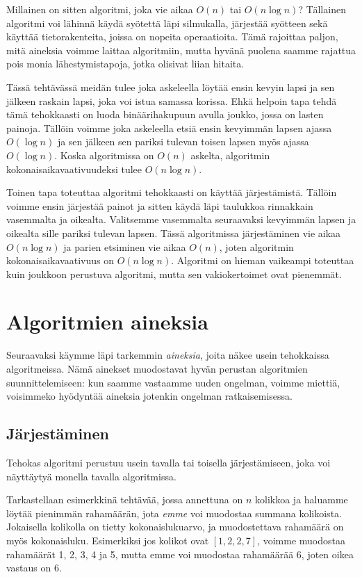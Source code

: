 Millainen on sitten algoritmi, joka vie aikaa $O(n)$ tai $O(n \log n)$?
Tällainen algoritmi voi lähinnä käydä syötettä läpi silmukalla,
järjestää syötteen sekä käyttää tietorakenteita,
joissa on nopeita operaatioita.
Tämä rajoittaa paljon, mitä aineksia voimme laittaa algoritmiin,
mutta hyvänä puolena saamme rajattua pois monia lähestymistapoja,
jotka olisivat liian hitaita.

Tässä tehtävässä meidän tulee joka askeleella löytää
ensin kevyin lapsi ja sen jälkeen raskain lapsi,
joka voi istua samassa korissa.
Ehkä helpoin tapa tehdä tämä tehokkaasti
on luoda binäärihakupuun avulla joukko, jossa on lasten painoja.
Tällöin voimme joka askeleella etsiä ensin kevyimmän
lapsen ajassa $O(\log n)$ ja sen jälkeen sen pariksi
tulevan toisen lapsen myös ajassa $O(\log n)$.
Koska algoritmissa on $O(n)$ askelta, algoritmin
kokonaisaikavaativuudeksi tulee $O(n \log n)$.

Toinen tapa toteuttaa algoritmi tehokkaasti on käyttää
järjestämistä.
Tällöin voimme ensin järjestää painot ja sitten käydä
läpi taulukkoa rinnakkain vasemmalta ja oikealta.
Valitsemme vasemmalta seuraavaksi kevyimmän lapsen
ja oikealta sille pariksi tulevan lapsen.
Tässä algoritmissa järjestäminen vie aikaa $O(n \log n)$
ja parien etsiminen vie aikaa $O(n)$,
joten algoritmin kokonaisaikavaativuus on $O(n \log n)$.
Algoritmi on hieman vaikeampi toteuttaa kuin joukkoon
perustuva algoritmi, mutta sen vakiokertoimet ovat pienemmät.

\section{Algoritmien aineksia}

Seuraavaksi käymme läpi tarkemmin \emph{aineksia},
joita näkee usein tehokkaissa algoritmeissa.
Nämä ainekset muodostavat hyvän perustan algoritmien
suunnittelemiseen: kun saamme vastaamme uuden ongelman,
voimme miettiä, voisimmeko hyödyntää aineksia jotenkin
ongelman ratkaisemisessa.

\subsection{Järjestäminen}

Tehokas algoritmi perustuu usein tavalla tai
toisella järjestämiseen, joka voi näyttäytyä
monella tavalla algoritmissa.

Tarkastellaan esimerkkinä tehtävää, jossa annettuna on
$n$ kolikkoa ja haluamme löytää pienimmän rahamäärän,
jota \emph{emme} voi muodostaa summana kolikoista.
Jokaisella kolikolla on tietty kokonaislukuarvo, ja
muodostettava rahamäärä on myös kokonaisluku.
Esimerkiksi jos kolikot ovat $[1,2,2,7]$,
voimme muodostaa rahamäärät 1, 2, 3, 4 ja 5,
mutta emme voi muodostaa rahamäärää 6,
joten oikea vastaus on 6.

